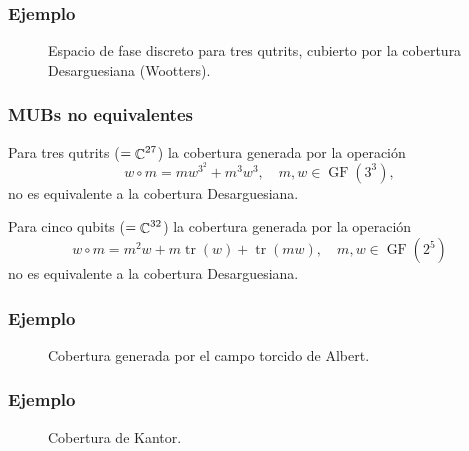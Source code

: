 \documentclass[10pt]{beamer}
\DeclareMathOperator{\C}{\mathbb{C}}
\let\H\relax
\DeclareMathOperator{\H}{\mathcal H}
\DeclareMathOperator{\tr}{tr}
\DeclareMathOperator{\GF}{GF}
\begin{document}
  \begin{frame}
    \frametitle{Ejemplo}

    \begin{figure}[h]
      \centering
      \scalebox{0.6}{
        
      }
      \caption{Espacio de fase discreto para tres qutrits,
      cubierto por la cobertura Desarguesiana (Wootters).}
      \label{fig:affine-desargues-3-3}
    \end{figure}
  \end{frame}

  \begin{frame}
    \frametitle{MUBs no equivalentes}

    \begin{example}
      Para tres qutrits ($\H = \C^{27}$) la cobertura
      generada por la operación
      \begin{equation}
        w \circ m = m w^{3^2} + m^{3} w^{3},
        \quad m,w \in \GF(3^{3}),
      \end{equation}
      no es equivalente a la cobertura Desarguesiana.
    \end{example}

    \begin{example}[Kantor]
      Para cinco qubits ($\H = \C^{32}$) la cobertura
      generada por la operación
      \begin{equation}
        w \circ m = m^2 w + m \tr(w) + \tr(mw),
        \quad m,w \in \GF(2^{5})
      \end{equation}
      no es equivalente a la cobertura Desarguesiana.
    \end{example}
  \end{frame}

  \begin{frame}
    \frametitle{Ejemplo}
    \begin{figure}[h]
      \centering
      \scalebox{0.6}{
        
      }
      \caption{Cobertura generada por el campo torcido de
      Albert.}
      \label{fig:affine-albert-3-3}
    \end{figure}
  \end{frame}

  \begin{frame}
    \frametitle{Ejemplo}
    \begin{figure}[h]
      \centering
      \scalebox{0.6}{
        
      }
      \caption{Cobertura de Kantor.}
      \label{fig:affine-kantor-2-5}
    \end{figure}
  \end{frame}
\end{document}
